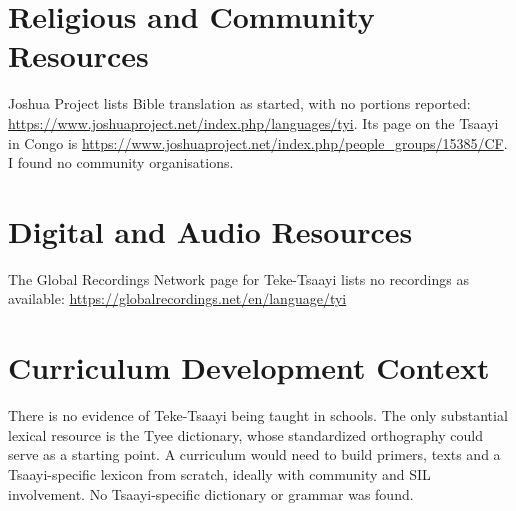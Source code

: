\documentclass[12pt]{article}
\begin{document}
\section{Religious and Community Resources}
Joshua Project lists Bible translation as started, with no portions reported: \url{https://www.joshuaproject.net/index.php/languages/tyi}. Its page on the Tsaayi in Congo is \url{https://www.joshuaproject.net/index.php/people_groups/15385/CF}. I found no community organisations.

\section{Digital and Audio Resources}
The Global Recordings Network page for Teke-Tsaayi lists no recordings as available: \url{https://globalrecordings.net/en/language/tyi}

\section{Curriculum Development Context}
There is no evidence of Teke-Tsaayi being taught in schools. The only substantial lexical resource is the Tyee dictionary, whose standardized orthography could serve as a starting point. A curriculum would need to build primers, texts and a Tsaayi-specific lexicon from scratch, ideally with community and SIL involvement. No Tsaayi-specific dictionary or grammar was found.
\end{document}
